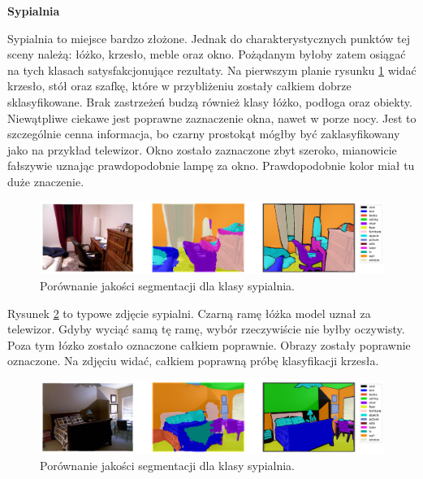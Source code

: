 \noindent
\textbf{Sypialnia}

Sypialnia to miejsce bardzo złożone. Jednak do charakterystycznych punktów tej sceny należą: łóżko, krzesło, meble oraz okno. Pożądanym byłoby zatem osiągać na tych klasach satysfakcjonujące rezultaty. Na pierwszym planie rysunku \ref{fig:bedroom-pred-1} widać krzesło, stół oraz szafkę, które w przybliżeniu zostały całkiem dobrze sklasyfikowane. Brak zastrzeżeń budzą również klasy łóżko, podłoga oraz obiekty. Niewątpliwe ciekawe jest poprawne zaznaczenie okna, nawet w porze nocy. Jest to szczególnie cenna informacja, bo czarny prostokąt mógłby być zaklasyfikowany jako na przykład telewizor. Okno zostało zaznaczone zbyt szeroko, mianowicie fałszywie uznając prawdopodobnie lampę za okno. Prawdopodobnie kolor miał tu duże znaczenie.

\begin{figure}[ht!]
    \centering
    \includegraphics[width=\textwidth]{img/preds_analysis/gt_vs_pred/bedroom-1.png}
    \caption{Porównanie jakości segmentacji dla klasy sypialnia.}
    \label{fig:bedroom-pred-1}
\end{figure}

Rysunek \ref{fig:bedroom-pred-2} to typowe zdjęcie sypialni. Czarną ramę łóżka model uznał za telewizor. Gdyby wyciąć samą tę ramę, wybór rzeczywiście nie byłby oczywisty. Poza tym łózko zostało oznaczone całkiem poprawnie. Obrazy zostały poprawnie oznaczone. Na zdjęciu widać, całkiem poprawną próbę klasyfikacji krzesła.

\begin{figure}[ht!]
    \centering
    \includegraphics[width=\textwidth]{img/preds_analysis/gt_vs_pred/bedroom-2.png}
    \caption{Porównanie jakości segmentacji dla klasy sypialnia.}
    \label{fig:bedroom-pred-2}
\end{figure}

